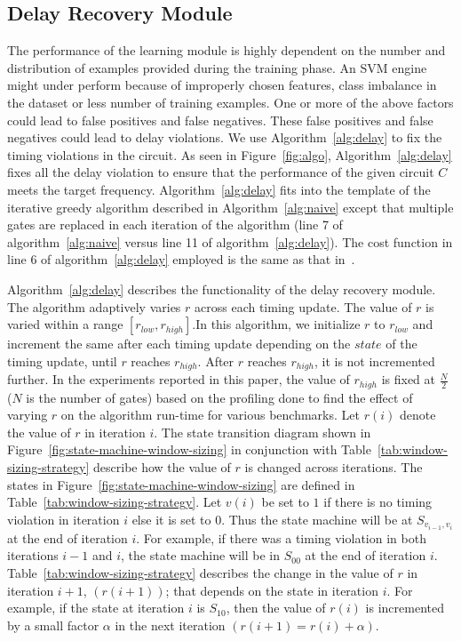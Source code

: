  
\subsection{Delay Recovery Module}
The performance of the learning module is highly dependent on the number and distribution of examples provided during the training phase. An SVM engine might under perform because of improperly chosen features, class imbalance in the dataset or less number of training examples. One or more of the above factors could lead to false positives and false negatives. These false positives and false negatives could lead to delay violations. We use Algorithm~\ref{alg:delay} to fix the timing violations in the circuit.
As seen in Figure~\ref{fig:algo}, Algorithm~\ref{alg:delay} fixes all the delay violation to ensure that the performance of the given circuit $C$ meets the target frequency. Algorithm~\ref{alg:delay} fits into the template of the iterative greedy algorithm described in Algorithm~\ref{alg:naive} except that multiple gates are replaced in each iteration of the algorithm (line 7 of algorithm~\ref{alg:naive} versus line 11 of algorithm~\ref{alg:delay}). The cost function in line 6 of algorithm~\ref{alg:delay} employed is the same as that in~\cite{hu:12}.

Algorithm~\ref{alg:delay} describes the functionality of the delay recovery module. The algorithm adaptively varies $r$ across each timing update. The value of $r$ is varied within a range $[r_{low}, r_{high}]$.In this algorithm, we initialize $r$ to $r_{low}$ and increment the same after each timing update depending on the $state$ of the timing update, until $r$ reaches $r_{high}$. After $r$ reaches $r_{high}$, it is not incremented further. In the experiments reported in this paper, the value of $r_{high}$ is fixed at $\frac{N}{2}$ ($N$ is the number of gates) based on the profiling done to find the effect of varying $r$ on the algorithm run-time for various benchmarks. Let $r(i)$ denote the value of $r$ in iteration $i$. The state transition diagram shown in Figure~\ref{fig:state-machine-window-sizing} in conjunction with Table~\ref{tab:window-sizing-strategy} describe how the value of $r$ is changed across iterations. The states in Figure~\ref{fig:state-machine-window-sizing} are defined in Table~\ref{tab:window-sizing-strategy}. Let $v(i)$ be set to $1$ if there is no timing violation in iteration $i$ else it is set to $0$. Thus the state machine will be at $S_{v_{i-1},v_i}$ at the end of iteration $i$. For example, if there was a timing violation in both iterations $i-1$ and $i$, the state machine will be in $S_{00}$ at the end of iteration $i$. Table~\ref{tab:window-sizing-strategy} describes the change in the value of $r$ in iteration $i+1$, $(r(i+1))$; that depends on the state in iteration $i$. For example, if the state at iteration $i$ is $S_{10}$, then the value of $r(i)$ is incremented by a small factor $\alpha$ in the next iteration $(r(i+1)=r(i)+\alpha)$. 
 
